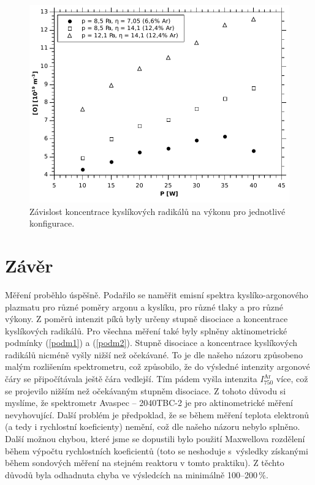 \documentclass[12pt]{article}
\begin{document}
\begin{figure}[htbp]
\begin{center}
\includegraphics[width=12cm]{concentration.pdf}
\caption{Závislost koncentrace kyslíkových radikálů na výkonu pro jednotlivé konfigurace.}
\label{conc}
\end{center}
\end{figure}


\section{Závěr}
Měření proběhlo úspěšně. Podařilo se naměřit emisní spektra kyslíko-argonového plazmatu pro různé poměry argonu a kyslíku, pro různé tlaky a pro různé výkony. Z poměrů intenzit píků byly určeny stupně disociace a koncentrace kyslíkových radikálů. Pro všechna měření také byly splněny aktinometrické podmínky (\ref{podm1}) a (\ref{podm2}). Stupně disociace a koncentrace kyslíkových radikálů nicméně vyšly nižší než očekávané. To je dle našeho názoru způsobeno malým rozlišením spektrometru, což způsobilo, že do výsledné intenzity argonové čáry se připočítávala ještě čára vedlejší. Tím pádem vyšla intenzita $I_{750}^\mathrm{Ar}$ více, což se projevilo nižším než očekávaným stupněm disociace. Z tohoto důvodu si myslíme, že spektrometr Avaspec -- 2040TBC-2 je pro aktinometrické měření nevyhovující. Další problém je předpoklad, že se během měření teplota elektronů (a tedy i rychlostní koeficienty) nemění, což dle našeho názoru nebylo splněno. Další možnou chybou, které jsme se dopustili bylo použití Maxwellova rozdělení během výpočtu rychlostních koeficientů (toto se neshoduje s~výsledky získanými během sondových měření na stejném reaktoru v tomto praktiku). Z těchto důvodů byla odhadnuta chyba ve výsledcích na minimálně 100--200\,\%. 
\end{document}

